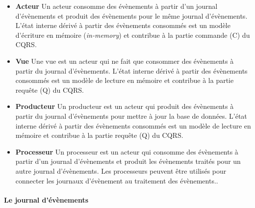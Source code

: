 \begin{itemize}
	\item \textbf{Acteur} Un acteur consomme des évènements à partir d'un journal 
	d'évènements et produit des évènements pour le même journal d'évènements. 
	L'état interne dérivé à partir des évènements consommés est un modèle 
	d'écriture 
	en mémoire (\textit{in-memory}) et contribue à la partie commande (C) du 
	CQRS.
	\item \textbf{Vue} Une vue est un acteur qui ne fait que consommer des 
	évènements à 
	partir du journal d'évènements. L'état interne dérivé à partir des évènements 
	consommés est un modèle de lecture en mémoire et contribue à la partie 
	requête (Q) du CQRS.
	\item \textbf{Producteur} Un producteur est un acteur qui produit des 
	évènements à 
	partir 
	du journal d'évènements pour mettre à jour la base de données. L'état interne 
	dérivé 
	à partir des évènements consommés est un modèle de lecture en mémoire et 
	contribue à la partie requête (Q) du CQRS.
	\item \textbf{Processeur} Un processeur est un acteur qui consomme des 
	évènements 
	à 
	partir d'un journal d'évènements et produit les évènements traités pour un autre 
	journal d'évènements. Les processeurs peuvent être utilisés pour connecter les 
	journaux d'évènement au traitement des évènements..
\end{itemize}


\paragraph{Le journal d'évènements}

